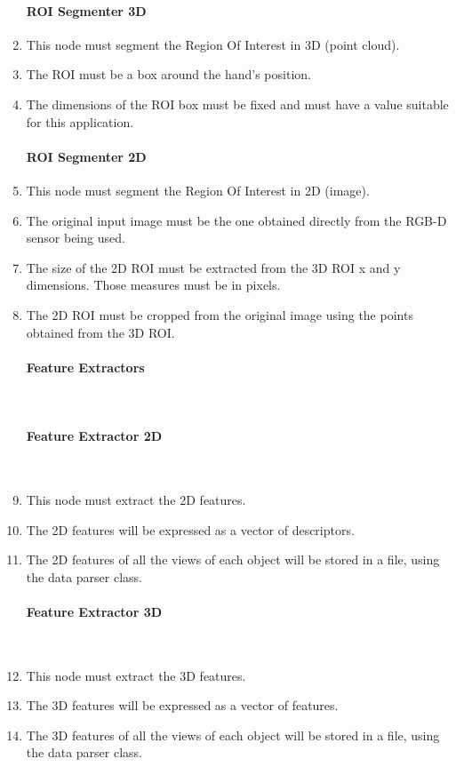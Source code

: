 \begin{enumerate}[label=\textbf{FR\threedigits*}, leftmargin=2cm]
   \paragraph{ROI Segmenter 3D}
	\item This node must segment the Region Of Interest in 3D (point cloud). 
	\item The ROI must be a box around the hand's position. 
	\item The dimensions of the ROI box must be fixed and must have a value suitable for this application.  
   \paragraph{ROI Segmenter 2D}
   	\item This node must segment the Region Of Interest in 2D (image).
   	\item The original input image must be the one obtained directly from the RGB-D sensor being used.
   	\item The size of the 2D ROI must be extracted from the 3D ROI x and y dimensions. Those measures must be in pixels. 
	\item The 2D ROI must be cropped from the original image using the points obtained from the 3D ROI. 

\paragraph{Feature Extractors}\mbox{}\\

   \paragraph{Feature Extractor 2D}\mbox{}\\
	\item This node must extract the 2D features. 
	\item The 2D features will be expressed as a vector of descriptors. %
	\item The 2D features of all the views of each object will be stored in a file, using the data parser class.  
  
  \paragraph{Feature Extractor 3D}\mbox{}\\
   	\item This node must extract the 3D features. 
	\item The 3D features will be expressed as a vector of features. %
	\item The 3D features of all the views of each object will be stored in a file, using the data parser class.  


\end{enumerate}
